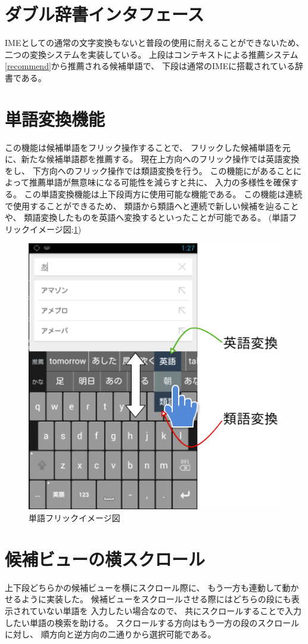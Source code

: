 \section{ダブル辞書インタフェース}
IMEとしての通常の文字変換もないと普段の使用に耐えることができないため、
二つの変換システムを実装している。
上段はコンテキストによる推薦システム\ref{recommend}から推薦される候補単語で、
下段は通常のIMEに搭載されている辞書である。

\section{単語変換機能}
\label{wordflick}
この機能は候補単語をフリック操作することで、
フリックした候補単語を元に、新たな候補単語郡を推薦する。
現在上方向へのフリック操作では英語変換をし、
下方向へのフリック操作では類語変換を行う。
この機能にがあることによって推薦単語が無意味になる可能性を減らすと共に、
入力の多様性を確保する。
この単語変換機能は上下段両方に使用可能な機能である。
この機能は連続で使用することができるため、
類語から類語へと連続で新しい候補を辿ることや、
類語変換したものを英語へ変換するといったことが可能である。
(単語フリックイメージ図:\ref{fig:wordflick})
\begin{figure}[htbp]
  \begin{center}
    \includegraphics[width=14cm,bb=0 0 461 485]{images/candidateflick.png}
  \end{center}
  \caption{単語フリックイメージ図}
  \label{fig:wordflick}
\end{figure}

\section{候補ビューの横スクロール}
上下段どちらかの候補ビューを横にスクロール際に、
もう一方も連動して動かせるように実装した。
候補ビューをスクロールさせる際にはどちらの段にも表示されていない単語を
入力したい場合なので、
共にスクロールすることで入力したい単語の検索を助ける。
スクロールする方向はもう一方の段のスクロールに対し、
順方向と逆方向の二通りから選択可能である。

